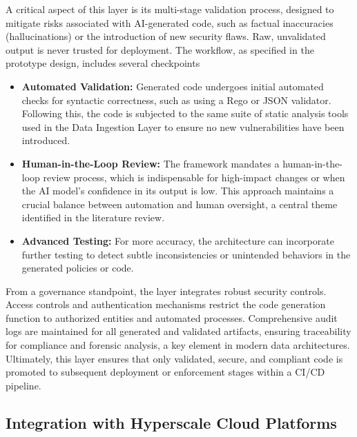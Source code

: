A critical aspect of this layer is its multi-stage validation process, designed to mitigate risks associated with AI-generated code, such as factual inaccuracies (hallucinations) or the introduction of new security flaws\cite{kumar_generative_nodate}. Raw, unvalidated output is never trusted for deployment. The workflow, as specified in the prototype design, includes several checkpoints

\begin{itemize}
    \item \textbf{Automated Validation:} Generated code undergoes initial automated checks for syntactic correctness, such as using a Rego or JSON validator. Following this, the code is subjected to the same suite of static analysis tools used in the Data Ingestion Layer to ensure no new vulnerabilities have been introduced.
    \item \textbf{Human-in-the-Loop Review:} The framework mandates a human-in-the-loop review process, which is indispensable for high-impact changes or when the AI model's confidence in its output is low. This approach maintains a crucial balance between automation and human oversight, a central theme identified in the literature review.
    \item \textbf{Advanced Testing:} For more accuracy, the architecture can incorporate further testing to detect subtle inconsistencies or unintended behaviors in the generated policies or code.
\end{itemize}

From a governance standpoint, the layer integrates robust security controls. Access controls and authentication mechanisms restrict the code generation function to authorized entities and automated processes. Comprehensive audit logs are maintained for all generated and validated artifacts, ensuring traceability for compliance and forensic analysis, a key element in modern data architectures\cite{ismail_big_2025-1}. Ultimately, this layer ensures that only validated, secure, and compliant code is promoted to subsequent deployment or enforcement stages within a CI/CD pipeline.



\subsection{Integration with Hyperscale Cloud Platforms} %
\label{sec:Integration with Hyperscale Cloud Platforms}

